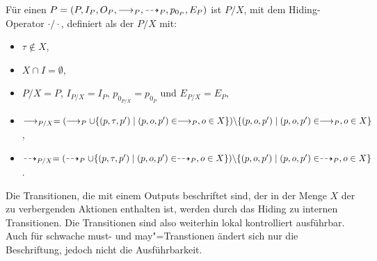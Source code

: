 \begin{Def}
  Für einen \MEIO{} $P = (P,I_P,O_P,\must _P, \may _P, p_{0_P}, E_P)$ ist
  $P/X$, mit dem Hiding-Operator $\cdot /\cdot$, definiert als der \MEIO{}
  $P/X$ mit:
  \begin{itemize}
    \item $\tau \notin X$,
    \item $X\cap I = \emptyset$,
    \item $P/X = P$, $I_{P/X} = I_P$, $p_{0_{P/X}} = p_{0_P}$ und $E_{P/X} =
      E_P$,
    \item $\must _{P/X} = (\must _P \cup \{(p,\tau,p')\mid (p,o,p')\in \must
      _P, o \in X\})\backslash \{(p,o,p')\mid (p,o,p')\in \must _P, o \in X\}$,
    \item $\may _{P/X} = (\may _P \cup \{(p,\tau,p')\mid (p,o,p')\in \may _P, o
      \in X\})\backslash \{(p,o,p')\mid (p,o,p')\in \may _P, o \in X\}$.
  \end{itemize}
\end{Def}

Die Transitionen, die mit einem Outputs beschriftet sind, der in der Menge $X$
der zu verbergenden Aktionen enthalten ist, werden durch das Hiding zu internen
Transitionen. Die Transitionen sind also weiterhin lokal kontrolliert
ausführbar. Auch für schwache must- und may"=Transtionen ändert sich nur die
Beschriftung, jedoch nicht die Ausführbarkeit.

